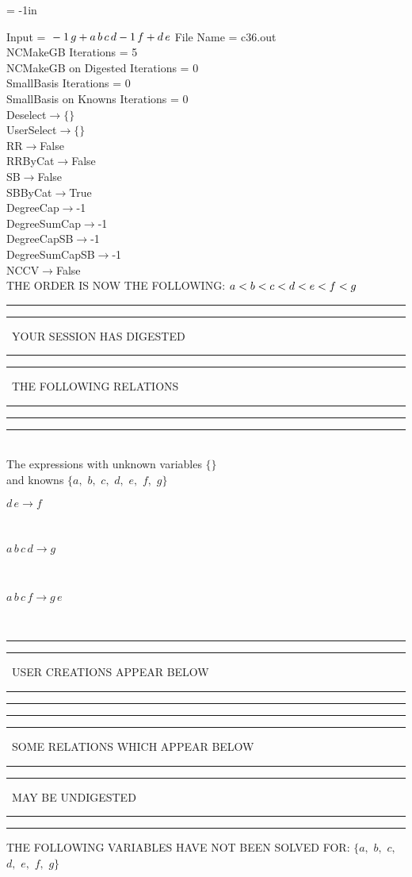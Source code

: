 \voffset = -1in
\evensidemargin 0.1in
\oddsidemargin 0.1in
\textheight 9in
\textwidth 6in

\normalsize
\baselineskip=12pt
\noindent
Input = 
$
\\-1\,
 g + a\,
 b\,
 c\,
 d\\
-1\,
 f + d\,
 e\\
$
File Name = c36.out\\
NCMakeGB Iterations = 5\\
NCMakeGB on Digested Iterations = 0\\
SmallBasis Iterations = 0\\
SmallBasis on Knowns Iterations = 0\\
Deselect$\rightarrow \{\}$\\
UserSelect$\rightarrow \{\}$\\
RR$\rightarrow $False\\
RRByCat$\rightarrow $False\\
SB$\rightarrow $False\\
SBByCat$\rightarrow $True\\
DegreeCap$\rightarrow $-1\\
DegreeSumCap$\rightarrow $-1\\
DegreeCapSB$\rightarrow $-1\\
DegreeSumCapSB$\rightarrow $-1\\
NCCV$\rightarrow $False\\
THE ORDER IS NOW THE FOLLOWING:\hfil\break
$
a<b<c<d<e<f<g\\
$
\rule[2pt]{6in}{4pt}\hfil\break
\rule[2pt]{1.879in}{4pt}
\ YOUR SESSION HAS DIGESTED\ 
\rule[2pt]{1.879in}{4pt}\hfil\break
\rule[2pt]{1.923in}{4pt}
\ THE FOLLOWING RELATIONS\ 
\rule[2pt]{1.923in}{4pt}\hfil\break
\rule[2pt]{6in}{4pt}\hfil\break
\rule[3pt]{6in}{.7pt}\\
The expressions with unknown variables $\{\}$\\
and knowns $\{a,
$ $
b,
$ $
c,
$ $
d,
$ $
e,
$ $
f,
$ $
g\}$\smallskip\\
\begin{minipage}{6in}
$
d\,
 e\rightarrow f
$
\end{minipage}\medskip \\
\begin{minipage}{6in}
$
a\,
 b\,
 c\,
 d\rightarrow g
$
\end{minipage}\medskip \\
\begin{minipage}{6in}
$
a\,
 b\,
 c\,
 f\rightarrow g\,
 e
$
\end{minipage}\\
\rule[2pt]{6in}{1pt}\hfil\break
\rule[2.5pt]{1.701in}{1pt}
\ USER CREATIONS APPEAR BELOW\ 
\rule[2.5pt]{1.701in}{1pt}\hfil\break
\rule[2pt]{6in}{1pt}\hfil\break
\rule[2pt]{6in}{4pt}\hfil\break
\rule[2pt]{1.45in}{4pt}
\ SOME RELATIONS WHICH APPEAR BELOW\ 
\rule[2pt]{1.45in}{4pt}\hfil\break
\rule[2pt]{2.18in}{4pt}
\ MAY BE UNDIGESTED\ 
\rule[2pt]{2.18in}{4pt}\hfil\break
\rule[2pt]{6in}{4pt}\hfil\break
THE FOLLOWING VARIABLES HAVE NOT BEEN SOLVED FOR:\hfil\break
$\{a,
$ $
b,
$ $
c,
$ $
d,
$ $
e,
$ $
f,
$ $
g\}$
\smallskip\\
\vspace{10pt}

